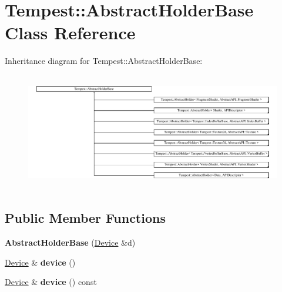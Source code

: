\hypertarget{class_tempest_1_1_abstract_holder_base}{\section{Tempest\+:\+:Abstract\+Holder\+Base Class Reference}
\label{class_tempest_1_1_abstract_holder_base}
}
Inheritance diagram for Tempest\+:\+:Abstract\+Holder\+Base\+:\begin{figure}[H]
\begin{center}
\leavevmode
\includegraphics[height=5.174538cm]{class_tempest_1_1_abstract_holder_base}
\end{center}
\end{figure}
\subsection*{Public Member Functions}
\begin{DoxyCompactItemize}
\item 
\hypertarget{class_tempest_1_1_abstract_holder_base_aed21fc777d26c700eeedf889297371eb}{{\bfseries Abstract\+Holder\+Base} (\hyperlink{class_tempest_1_1_device}{Device} \&d)}\label{class_tempest_1_1_abstract_holder_base_aed21fc777d26c700eeedf889297371eb}

\item 
\hypertarget{class_tempest_1_1_abstract_holder_base_af9f56b2760cea7fd5fa07b88471c37b3}{\hyperlink{class_tempest_1_1_device}{Device} \& {\bfseries device} ()}\label{class_tempest_1_1_abstract_holder_base_af9f56b2760cea7fd5fa07b88471c37b3}

\item 
\hypertarget{class_tempest_1_1_abstract_holder_base_af2469a93aed33f7cf0108e0dc92932f1}{\hyperlink{class_tempest_1_1_device}{Device} \& {\bfseries device} () const }\label{class_tempest_1_1_abstract_holder_base_af2469a93aed33f7cf0108e0dc92932f1}

\end{DoxyCompactItemize}
